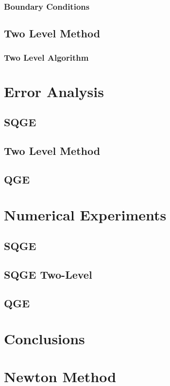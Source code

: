 \documentclass[12pt,draft,doublespace]{VTthesis}
\begin{document}
      \subsection{Boundary Conditions} \label{sse:BCs}
      
    \section{Two Level Method} \label{sec:TwoLevel}
    
      \subsection{Two Level Algorithm} \label{sse:Algorithm}
      

  \chapter{Error Analysis} \label{ch:Errors}
  
    \section{SQGE} \label{sec:SQGEErrors}
    
    \section{Two Level Method} \label{sse:SQGE2LE}
    
    \section{QGE} \label{sec:QGEError}
    

  \chapter{Numerical Experiments} \label{ch:Tests}
  
    \section{SQGE} \label{sec:SQGETests}
    
    \section{SQGE Two-Level} \label{sec:SQGE2LTests}
    
    \section{QGE} \label{sec:QGETests}
    

  \chapter{Conclusions} \label{ch:Conclusions}
  

  
  

  \appendix
  \chapter{Newton Method} \label{sec:Newton}
  
\end{document}
